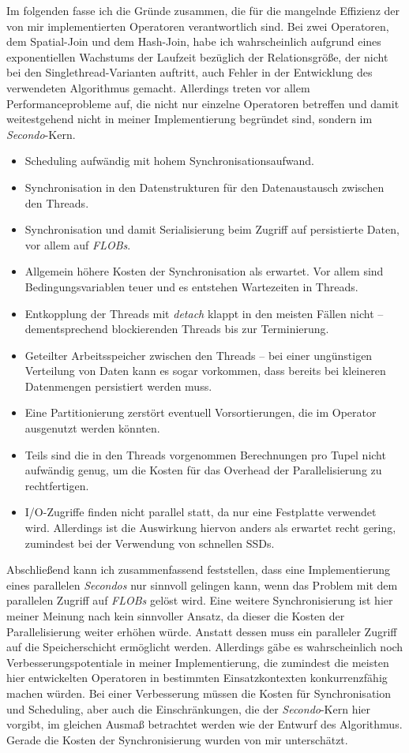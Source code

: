 \documentclass[a4paper,12pt,twoside]{article}
\newcommand{\Fb}[1]{\textit{#1}} %
\begin{document}
Im folgenden fasse ich die Gründe zusammen, die für die mangelnde Effizienz der von mir implementierten Operatoren verantwortlich sind. Bei zwei Operatoren, dem Spatial-Join und dem Hash-Join, habe ich wahrscheinlich aufgrund eines exponentiellen Wachstums der Laufzeit bezüglich der Relationsgröße, der nicht bei den Singlethread-Varianten auftritt, auch Fehler in der Entwicklung des verwendeten Algorithmus gemacht. Allerdings treten vor allem Performanceprobleme auf, die nicht nur einzelne Operatoren betreffen und damit weitestgehend nicht in meiner Implementierung begründet sind, sondern im \Fb{Secondo}-Kern.

\begin{itemize}
	\item Scheduling aufwändig mit hohem Synchronisationsaufwand.
	\item Synchronisation in den Datenstrukturen für den Datenaustausch zwischen den Threads.
	\item Synchronisation und damit Serialisierung beim Zugriff auf persistierte Daten, vor allem auf \Fb{FLOBs}.
	\item Allgemein höhere Kosten der Synchronisation als erwartet. Vor allem sind Bedingungsvariablen teuer und es entstehen Wartezeiten in Threads.
	\item Entkopplung der Threads mit \Fb{detach} klappt in den meisten Fällen nicht -- dementsprechend blockierenden Threads bis zur Terminierung.
	\item Geteilter Arbeitsspeicher zwischen den Threads -- bei einer ungünstigen Verteilung von Daten kann es sogar vorkommen, dass bereits bei kleineren Datenmengen persistiert werden muss.
	\item Eine Partitionierung zerstört eventuell Vorsortierungen, die im Operator ausgenutzt werden könnten.
	\item Teils sind die in den Threads vorgenommen Berechnungen pro Tupel nicht aufwändig genug, um die Kosten für das Overhead der Parallelisierung zu rechtfertigen.
	\item I/O-Zugriffe finden nicht parallel statt, da nur eine Festplatte verwendet wird. Allerdings ist die Auswirkung hiervon anders als erwartet recht gering, zumindest bei der Verwendung von schnellen SSDs.
\end{itemize}
 
Abschließend kann ich zusammenfassend feststellen, dass eine Implementierung eines parallelen \Fb{Secondos} nur sinnvoll gelingen kann, wenn das Problem mit dem parallelen Zugriff auf \Fb{FLOBs} gelöst wird. Eine weitere Synchronisierung ist hier meiner Meinung nach kein sinnvoller Ansatz, da dieser die Kosten der Parallelisierung weiter erhöhen würde. Anstatt dessen muss ein paralleler Zugriff auf die Speicherschicht ermöglicht werden. Allerdings gäbe es wahrscheinlich noch Verbesserungspotentiale in meiner Implementierung, die zumindest die meisten hier entwickelten Operatoren in bestimmten Einsatzkontexten konkurrenzfähig machen würden. Bei einer Verbesserung müssen die Kosten für Synchronisation und Scheduling, aber auch die Einschränkungen, die der \Fb{Secondo}-Kern hier vorgibt, im gleichen Ausmaß betrachtet werden wie der Entwurf des Algorithmus. Gerade die Kosten der Synchronisierung wurden von mir unterschätzt.

\pagebreak 
\printbibliography[notcategory=nicht-in-bib]
\end{document}
